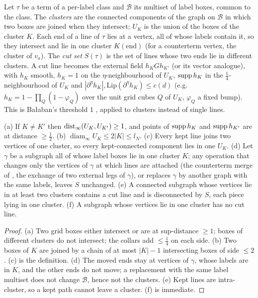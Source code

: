\begin{definition}\label{def:a06d:CCR}
Let $\tau$ be a term of a per-label class and $\mathcal B$ its multiset of label boxes, common to the class. The \emph{clusters} are the connected components of the graph on $\mathcal B$ in which two boxes are joined when they intersect; $U_K$ is the union of the boxes of the cluster $K$. Each end of a line of $\tau$ lies at a vertex, all of whose labels contain it, so they intersect and lie in one cluster $K(\mathrm{end})$ (for a counterterm vertex, the cluster of $v_a$). The \emph{cut set} $S(\tau)$ is the set of lines whose two ends lie in different clusters. A cut line becomes the external field $h_KGh_{K'}$ (or its vector analogue), with $h_K$ smooth, $h_K=1$ on the $\eta$-neighbourhood of $U_K$, $\operatorname{supp} h_K$ in the $\frac14$-neighbourhood of $U_K$ and $|\partial^\eta h_K|,\mathrm{Lip}(\partial^\eta h_K)\le c(d)$ (e.g.\ $h_K=1-\prod_Q(1-\varphi_Q)$ over the unit grid cubes $Q$ of $U_K$, $\varphi_Q$ a fixed bump). This is Ba{\l}aban's threshold $1$ \cite[p.~432]{Ba3}, applied to clusters instead of single lines.
\end{definition}

\begin{lemma}\label{lem:a06d:S22}
\textup{(a)} If $K\ne K'$ then $\operatorname{dist}_\infty(U_K,U_{K'})\ge1$, and points of $\operatorname{supp} h_K$ and $\operatorname{supp} h_{K'}$ are at distance $\ge\frac12$. \textup{(b)} $\operatorname{diam}_\infty U_K\le2|K|\le l_N$. \textup{(c)} Every kept line joins two vertices of one cluster, so every kept-connected component lies in one $U_K$. \textup{(d)} Let $\gamma$ be a subgraph all of whose label boxes lie in one cluster $K$; any operation that changes only the vertices of $\gamma$ at which lines are attached (the counterterm merge of \cite[p.~417]{Ba3}, the exchange of two external legs of $\gamma$), or replaces $\gamma$ by another graph with the same labels, leaves $S$ unchanged. \textup{(e)} A connected subgraph whose vertices lie in at least two clusters contains a cut line and is disconnected by $S$, each piece lying in one cluster. \textup{(f)} A subgraph whose vertices lie in one cluster has no cut line.
\end{lemma}

\begin{proof}
(a) Two grid boxes either intersect or are at sup-distance $\ge1$; boxes of different clusters do not intersect; the collars add $\le\frac14$ on each side. (b) Two boxes of $K$ are joined by a chain of at most $|K|-1$ intersecting boxes of side $\le2$. (c) is the definition. (d) The moved ends stay at vertices of $\gamma$, whose labels are in $K$, and the other ends do not move; a replacement with the same label multiset does not change $\mathcal B$, hence not the clusters. (e) Kept lines are intra-cluster, so a kept path cannot leave a cluster. (f) is immediate.
\end{proof}

